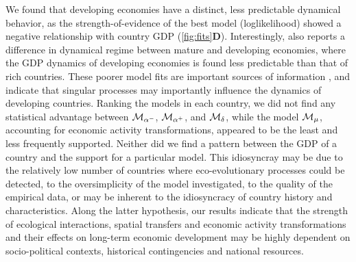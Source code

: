 We found that developing economies have a distinct, less predictable dynamical behavior, as the strength-of-evidence of the best model (loglikelihood) showed a negative relationship with country GDP (\cref{fig:fits}\textbf{D}). Interestingly, \cite{Cristelli2015} also reports a difference in dynamical regime between mature and developing economies, where the GDP dynamics of developing economies is found less predictable than that of rich countries. These poorer model fits are important sources of information \cite{Curtsdotter2019}, and indicate that singular processes may importantly influence the dynamics of developing countries.
% 
Ranking the models in each country, we did not find any statistical advantage between $\mathcal{M}_{\alpha^-}$, $\mathcal{M}_{\alpha^+}$, and $\mathcal{M}_\delta$, while the model $\mathcal{M}_\mu$, accounting for economic activity transformations, appeared to be the least and less frequently supported.
% 
% 
% 
Neither did we find a pattern between the GDP of a country and the support for a particular model. This idiosyncray may be due to the relatively low number of countries where eco-evolutionary processes could be detected, to the oversimplicity of the model investigated, to the quality of the empirical data, or may be inherent to the idiosyncracy of country history and characteristics.
% 
Along the latter hypothesis, our results indicate that the strength of ecological interactions, spatial transfers and economic activity transformations and their effects on long-term economic development may be highly dependent on socio-political contexts, historical contingencies and national resources.

